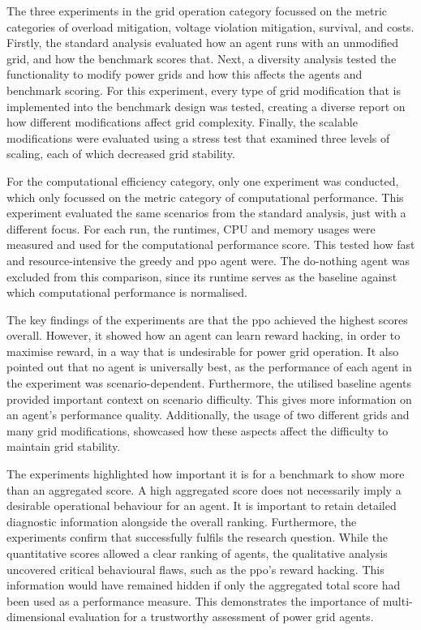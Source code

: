 The three experiments in the grid operation category focussed on the metric categories of overload mitigation, voltage violation mitigation, survival, and costs. Firstly, the standard analysis evaluated how an agent runs with an unmodified grid, and how the benchmark scores that. Next, a diversity analysis tested the functionality to modify power grids and how this affects the agents and benchmark scoring. For this experiment, every type of grid modification that is implemented into the benchmark design was tested, creating a diverse report on how different modifications affect grid complexity. Finally, the scalable modifications were evaluated using a stress test that examined three levels of scaling, each of which decreased grid stability.

For the computational efficiency category, only one experiment was conducted, which only focussed on the metric category of computational performance. This experiment evaluated the same scenarios from the standard analysis, just with a different focus. For each run, the runtimes, CPU and memory usages were measured and used for the computational performance score. This tested how fast and resource-intensive the greedy and \ac{ppo} agent were. The do-nothing agent was excluded from this comparison, since its runtime serves as the baseline against which computational performance is normalised.

The key findings of the experiments are that the \ac{ppo} achieved the highest scores overall. However, it showed how an agent can learn reward hacking, in order to maximise reward, in a way that is undesirable for power grid operation. It also pointed out that no agent is universally best, as the performance of each agent in the experiment was scenario-dependent. Furthermore, the utilised baseline agents provided important context on scenario difficulty. This gives more information on an agent's performance quality. Additionally, the usage of two different grids and many grid modifications, showcased how these aspects affect the difficulty to maintain grid stability. 

The experiments highlighted how important it is for a benchmark to show more than an aggregated score. A high aggregated score does not necessarily imply a desirable operational behaviour for an agent. It is important to retain detailed diagnostic information alongside the overall ranking. Furthermore, the experiments confirm that \benchmark successfully fulfils the research question. While the quantitative scores allowed a clear ranking of agents, the qualitative analysis uncovered critical behavioural flaws, such as the \ac{ppo}'s reward hacking. This information would have remained hidden if only the aggregated total score had been used as a performance measure. This demonstrates the importance of multi-dimensional evaluation for a trustworthy assessment of power grid agents.


